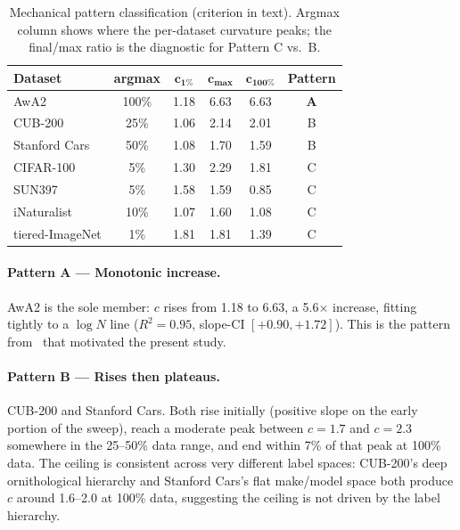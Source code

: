 \documentclass{article}
\begin{document}
\begin{table}[t]
\centering
\caption{Mechanical pattern classification (criterion in text). Argmax column shows where the per-dataset curvature peaks; the final/max ratio is the diagnostic for Pattern C vs.\ B.}
\label{tab:patterns}
\begin{tabular}{lccccc}
\toprule
\textbf{Dataset} & \textbf{argmax} & $\boldsymbol{c_{1\%}}$ & $\boldsymbol{c_{\max}}$ & $\boldsymbol{c_{100\%}}$ & \textbf{Pattern} \\
\midrule
AwA2            & 100\% & 1.18 & 6.63 & 6.63 & \textbf{A} \\
CUB-200         & 25\%  & 1.06 & 2.14 & 2.01 & B \\
Stanford Cars   & 50\%  & 1.08 & 1.70 & 1.59 & B \\
CIFAR-100       & 5\%   & 1.30 & 2.29 & 1.81 & C \\
SUN397          & 5\%   & 1.58 & 1.59 & 0.85 & C \\
iNaturalist     & 10\%  & 1.07 & 1.60 & 1.08 & C \\
tiered-ImageNet & 1\%   & 1.81 & 1.81 & 1.39 & C \\
\bottomrule
\end{tabular}
\end{table}

\paragraph{Pattern A --- Monotonic increase.}
AwA2 is the sole member: $c$ rises from 1.18 to 6.63, a 5.6$\times$ increase, fitting tightly to a $\log N$ line ($R^2 = 0.95$, slope-CI $[+0.90, +1.72]$).
This is the pattern from~\cite{bejleri2025bayesian} that motivated the present study.

\paragraph{Pattern B --- Rises then plateaus.}
CUB-200 and Stanford Cars.
Both rise initially (positive slope on the early portion of the sweep), reach a moderate peak between $c = 1.7$ and $c = 2.3$ somewhere in the 25--50\% data range, and end within 7\% of that peak at 100\% data.
The ceiling is consistent across very different label spaces: CUB-200's deep ornithological hierarchy and Stanford Cars's flat make/model space both produce $c$ around 1.6--2.0 at 100\% data, suggesting the ceiling is not driven by the label hierarchy.
\end{document}
